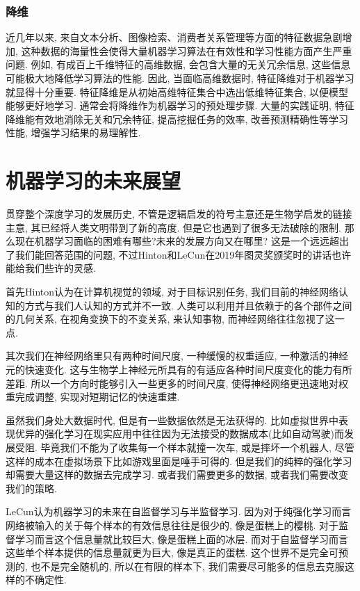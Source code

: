 \documentclass[lang=cn,11pt,a4paper]{elegantpaper}
\begin{document}
\subsubsection*{降维}
近几年以来, 来自文本分析、图像检索、消费者关系管理等方面的特征数据急剧增加, 这种数据的海量性会使得大量机器学习算法在有效性和学习性能方面产生严重问题. 例如, 有成百上千维特征的高维数据, 会包含大量的无关冗余信息, 这些信息可能极大地降低学习算法的性能. 因此, 当面临高维数据时, 特征降维对于机器学习就显得十分重要. 特征降维是从初始高维特征集合中选出低维特征集合, 以便模型能够更好地学习. 通常会将降维作为机器学习的预处理步骤. 大量的实践证明, 特征降维能有效地消除无关和冗余特征, 提高挖掘任务的效率, 改善预测精确性等学习性能, 增强学习结果的易理解性. 

\section{机器学习的未来展望}

贯穿整个深度学习的发展历史, 不管是逻辑启发的符号主意还是生物学启发的链接主意, 其已经将人类文明带到了新的高度. 但是它也遇到了很多无法破除的限制. 那么现在机器学习面临的困难有哪些?未来的发展方向又在哪里? 这是一个远远超出了我们能回答范围的问题, 不过Hinton和LeCun在2019年图灵奖颁奖时的讲话也许能给我们些许的灵感.

首先Hinton认为\cite{Youtube}在计算机视觉的领域, 对于目标识别任务, 我们目前的神经网络认知的方式与我们人认知的方式并不一致. 人类可以利用并且依赖于的各个部件之间的几何关系, 在视角变换下的不变关系, 来认知事物, 而神经网络往往忽视了这一点. \cite{kosiorek2019stacked}

其次我们在神经网络里只有两种时间尺度, 一种缓慢的权重适应, 一种激活的神经元的快速变化. 这与生物学上神经元所具有的有适应各种时间尺度变化的能力有所差距. 所以一个方向时能够引入一些更多的时间尺度, 使得神经网络更迅速地对权重完成调整, 实现对短期记忆的快速重建. 

虽然我们身处大数据时代, 但是有一些数据依然是无法获得的. 比如虚拟世界中表现优异的强化学习在现实应用中往往因为无法接受的数据成本(比如自动驾驶)而发展受阻. 毕竟我们不能为了收集每一个样本就撞一次车, 或是摔坏一个机器人, 尽管这样的成本在虚拟场景下比如游戏里面是唾手可得的. 但是我们的纯粹的强化学习却需要大量这样的数据去完成学习. 或者我们需要更多的数据, 或者我们需要改变我们的策略.

LeCun认为机器学习的未来在自监督学习与半监督学习. 因为对于纯强化学习而言网络被输入的关于每个样本的有效信息往往是很少的, 像是蛋糕上的樱桃. 对于监督学习而言这个信息量就比较巨大, 像是蛋糕上面的冰层. 而对于自监督学习而言这些单个样本提供的信息量就更为巨大, 像是真正的蛋糕. 这个世界不是完全可预测的, 也不是完全随机的, 所以在有限的样本下, 我们需要尽可能多的信息去克服这样的不确定性.
\end{document}

